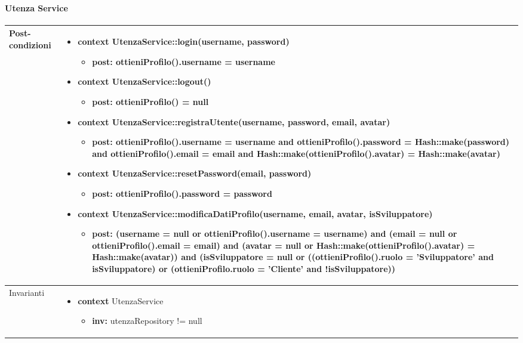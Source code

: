 \paragraph{Utenza Service}
\small\begin{tabular}{|| l | p{28em} ||} 
\hline
Post-condizioni & \begin{itemize}[leftmargin=*]
	\item \textbf{context} UtenzaService::login(username, password)
	\begin{itemize}
		\item[ ] \textbf{post:} ottieniProfilo().username = username
	\end{itemize}

	\item \textbf{context} UtenzaService::logout()
	\begin{itemize}
		\item[ ] \textbf{post:} ottieniProfilo() = null
	\end{itemize}
	
	\item \textbf{context} UtenzaService::registraUtente(username, password, email, avatar)
	\begin{itemize}
		\item[ ] \textbf{post:} ottieniProfilo().username = username and ottieniProfilo().password = Hash::make(password) and ottieniProfilo().email = email and Hash::make(ottieniProfilo().avatar) = Hash::make(avatar)
	\end{itemize}

	\item \textbf{context} UtenzaService::resetPassword(email, password)
	\begin{itemize}
		\item[ ] \textbf{post:} ottieniProfilo().password = password
	\end{itemize}
	
	\item \textbf{context} UtenzaService::modificaDatiProfilo(username, email, avatar, isSviluppatore)
	\begin{itemize}
		\item[ ] \textbf{post:} (username = null or ottieniProfilo().username = username) and (email = null or ottieniProfilo().email = email) and (avatar = null or Hash::make(ottieniProfilo().avatar) = Hash::make(avatar)) and (isSviluppatore = null or ((ottieniProfilo().ruolo = 'Sviluppatore' and isSviluppatore) or (ottieniProfilo.ruolo = 'Cliente' and !isSviluppatore))
	\end{itemize}
\end{itemize}\\
\hline
Invarianti & \begin{itemize}
	\item \textbf{context} UtenzaService
	\begin{itemize}
		\item[ ] \textbf{inv:} utenzaRepository != null
	\end{itemize}
\end{itemize}\\
\hline
\end{tabular}

